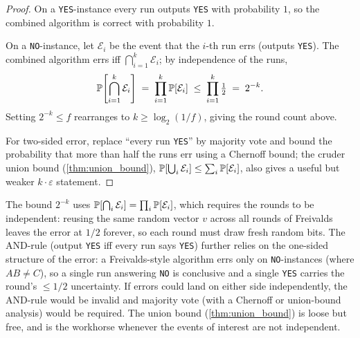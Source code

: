 \begin{proof}
On a \texttt{YES}-instance every run outputs \texttt{YES} with probability $1$, so the combined algorithm is correct with probability $1$.

On a \texttt{NO}-instance, let $\mathcal{E}_i$ be the event that the $i$-th run errs (outputs \texttt{YES}). The combined algorithm errs iff $\bigcap_{i=1}^k \mathcal{E}_i$; by independence of the runs,
\[
  \operatorname{\mathbb{P}}\!\left[\bigcap_{i=1}^k \mathcal{E}_i\right] \;=\; \prod_{i=1}^k \operatorname{\mathbb{P}}[\mathcal{E}_i] \;\le\; \prod_{i=1}^k \tfrac{1}{2} \;=\; 2^{-k}.
\]
Setting $2^{-k} \le f$ rearranges to $k \ge \log_2(1/f)$, giving the round count above.

For two-sided error, replace ``every run \texttt{YES}'' by majority vote and bound the probability that more than half the runs err using a Chernoff bound; the cruder union bound (\cref{thm:union_bound}), $\operatorname{\mathbb{P}}[\bigcup_i \mathcal{E}_i] \le \sum_i \operatorname{\mathbb{P}}[\mathcal{E}_i]$, also gives a useful but weaker $k \cdot \varepsilon$ statement.
\end{proof}

\begin{remark}
The bound $2^{-k}$ uses $\operatorname{\mathbb{P}}[\bigcap_i \mathcal{E}_i] = \prod_i \operatorname{\mathbb{P}}[\mathcal{E}_i]$, which requires the rounds to be independent: reusing the same random vector $v$ across all rounds of Freivalds leaves the error at $1/2$ forever, so each round must draw fresh random bits. The AND-rule (output \texttt{YES} iff every run says \texttt{YES}) further relies on the one-sided structure of the error: a Freivalds-style algorithm errs only on \texttt{NO}-instances (where $AB \ne C$), so a single run answering \texttt{NO} is conclusive and a single \texttt{YES} carries the round's $\le 1/2$ uncertainty. If errors could land on either side independently, the AND-rule would be invalid and majority vote (with a Chernoff or union-bound analysis) would be required. The union bound (\cref{thm:union_bound}) is loose but free, and is the workhorse whenever the events of interest are not independent.
\end{remark}

